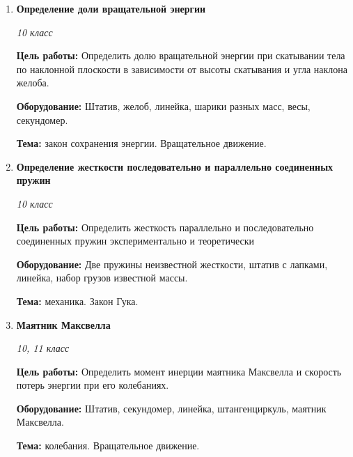 \documentclass[a4paper,10pt]{article}
\newcommand{\labtitle}[5]{
	\textbf{#2}\par
	\textit{#1 класс}\par
	\textbf{Цель работы:} #3\par
	\textbf{Оборудование:} #4\par
	\textbf{Тема:} #5
}
\begin{document}
\begin{enumerate}
		{Резиновый жгут, миллиметровая бумага, линейка, набор грузов известной массы, штатив.}
		{закон Гука. Модуль Юнга.}
	\item \labtitle
		{10}
		{Определение доли вращательной энергии}
		{Определить долю вращательной энергии при скатывании тела по наклонной плоскости в зависимости от высоты скатывания и угла наклона желоба.}
		{Штатив, желоб, линейка, шарики разных масс, весы, секундомер.}
		{закон сохранения энергии. Вращательное движение.}
	\item \labtitle
		{10}
		{Определение жесткости последовательно и параллельно соединенных пружин}
		{Определить жесткость параллельно и последовательно соединенных пружин экспериментально и теоретически}
		{Две пружины неизвестной жесткости, штатив с лапками, линейка, набор грузов известной массы.}
		{механика. Закон Гука.}
	\item \labtitle
		{10, 11}
		{Маятник Максвелла}
		{Определить момент инерции маятника Максвелла и скорость потерь энергии при его колебаниях.}
		{Штатив, секундомер, линейка, штангенциркуль, маятник Максвелла.}
		{колебания. Вращательное движение.}


\end{enumerate}
\end{document}
